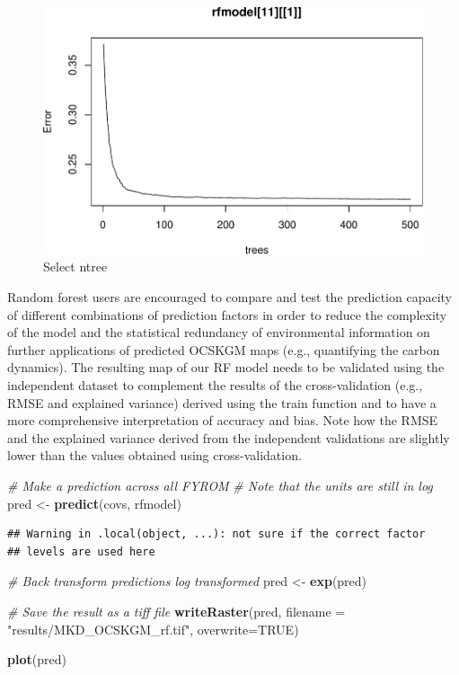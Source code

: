 \documentclass[10pt,b5paper,]{book}
\newenvironment{Shaded}{\begin{snugshade}}{\end{snugshade}}
\newcommand{\CommentTok}[1]{\textcolor[rgb]{0.56,0.35,0.01}{\textit{#1}}}
\newcommand{\DataTypeTok}[1]{\textcolor[rgb]{0.13,0.29,0.53}{#1}}
\newcommand{\KeywordTok}[1]{\textcolor[rgb]{0.13,0.29,0.53}{\textbf{#1}}}
\newcommand{\NormalTok}[1]{#1}
\newcommand{\OtherTok}[1]{\textcolor[rgb]{0.56,0.35,0.01}{#1}}
\newcommand{\StringTok}[1]{\textcolor[rgb]{0.31,0.60,0.02}{#1}}
\theoremstyle{definition}
\theoremstyle{definition}
\theoremstyle{definition}
\theoremstyle{remark}
\begin{document}
\begin{figure}
\centering
\includegraphics{SOCMapping_files/figure-latex/unnamed-chunk-60-1.pdf}
\caption{\label{fig:unnamed-chunk-60}Select ntree}
\end{figure}

Random forest users are encouraged to compare and test the prediction
capacity of different combinations of prediction factors in order to
reduce the complexity of the model and the statistical redundancy of
environmental information on further applications of predicted OCSKGM
maps (e.g., quantifying the carbon dynamics). The resulting map of our
RF model needs to be validated using the independent dataset to
complement the results of the cross-validation (e.g., RMSE and explained
variance) derived using the train function and to have a more
comprehensive interpretation of accuracy and bias. Note how the RMSE and
the explained variance derived from the independent validations are
slightly lower than the values obtained using cross-validation.

\begin{Shaded}
\begin{Highlighting}[]
\CommentTok{# Make a prediction across all FYROM}
\CommentTok{# Note that the units are still in log}
\NormalTok{pred <-}\StringTok{ }\KeywordTok{predict}\NormalTok{(covs, rfmodel)}
\end{Highlighting}
\end{Shaded}

\begin{verbatim}
## Warning in .local(object, ...): not sure if the correct factor
## levels are used here
\end{verbatim}

\begin{Shaded}
\begin{Highlighting}[]
\CommentTok{# Back transform predictions log transformed}
\NormalTok{pred <-}\StringTok{ }\KeywordTok{exp}\NormalTok{(pred)}

\CommentTok{# Save the result as a tiff file}
\KeywordTok{writeRaster}\NormalTok{(pred, }\DataTypeTok{filename =} \StringTok{"results/MKD_OCSKGM_rf.tif"}\NormalTok{,}
            \DataTypeTok{overwrite=}\OtherTok{TRUE}\NormalTok{)}

\KeywordTok{plot}\NormalTok{(pred)}
\end{Highlighting}
\end{Shaded}
\end{document}
